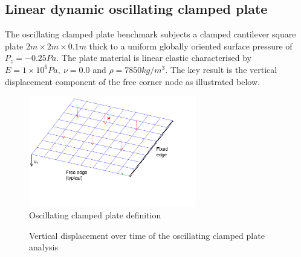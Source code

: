 \subsection{Linear dynamic oscillating clamped plate}

The oscillating clamped plate benchmark subjects a clamped cantilever square plate $2m\times2m\times0.1m$ thick to a uniform globally oriented surface pressure of $P_z = -0.25 Pa$. The plate material is linear elastic characterised by $E = 1\times 10^6 Pa,\ \nu = 0.0$ and $\rho = 7850 kg/m^3$. The key result is the vertical displacement component of the free corner node as illustrated below.

\begin{figure}[H]
	\centering
	\def\svgwidth{\columnwidth}
	\includegraphics[width=7.3cm]{images/quad_bend_problem.png}
	\caption{Oscillating clamped plate definition}
\end{figure}
\begin{figure}[H]
	\caption{\label{ref_label_overall}Vertical displacement over time of the oscillating clamped plate analysis}
\end{figure}

